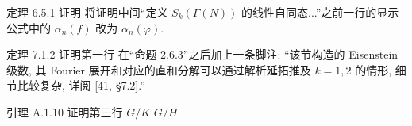 \documentclass{AJerrata}
\begin{document}
\begin{Errata}
		\item[定理 6.5.1 证明]
		将证明中间``定义 $S_k(\Gamma(N))$ 的线性自同态...''之前一行的显示公式中的 $\alpha_n(f)$ 改为 $\alpha_n(\varphi)$.
		
		
		\item[定理 7.1.2 证明第一行]
		在``命题 2.6.3''之后加上一条脚注: ``该节构造的 Eisenstein 级数, 其 Fourier 展开和对应的直和分解可以通过解析延拓推及 $k = 1, 2$ 的情形, 细节比较复杂, 详阅 [41, \S 7.2].''
		
		
		\item[引理 A.1.10 证明第三行]
		\Orig $G/K$
		\Corr $G/H$
	\end{Errata}
\end{document}
